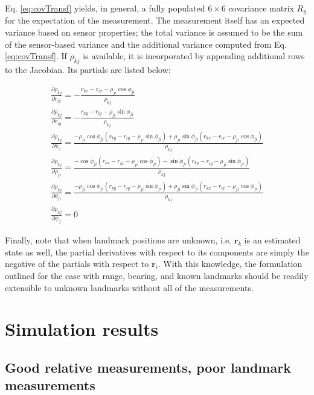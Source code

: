 \documentclass{aiaa-tc}
\newcommand{\B}[1]{\textbf{#1}} %
\begin{document}
Eq. \ref{eq:covTransf} yields, in general, a fully populated $6\times 6$ covariance matrix $R_y$ for the expectation of the measurement. The measurement itself has an expected variance based on sensor properties; the total variance is assumed to be the sum of the sensor-based variance and the additional variance computed from Eq. \ref{eq:covTransf}. If $\rho_{kj}$ is available, it is incorporated by appending additional rows to the Jacobian. Its partials are listed below:

\begin{align}
\frac{ \partial \rho_{kj} }{ \partial r_{ix} } = 
-\frac{ r_{kx}-r_{ix}-\rho_{ji}\cos{\phi_{ji}} }{\rho_{kj}} \\
\frac{ \partial \rho_{kj} }{ \partial r_{iy} } = 
-\frac{ r_{ky}-r_{iy}-\rho_{ji}\sin{\phi_{ji}} }{\rho_{kj}} \\
\frac{ \partial \rho_{kj} }{ \partial \psi_{i} } = 
\frac{ -\rho_{ji}\cos{\phi_{ji}}(r_{ky}-r_{iy}-\rho_{ji}\sin{\phi_{ji}}) + \rho_{ji}\sin{\phi_{ji}}(r_{kx}-r_{ix}-\rho_{ji}\cos{\phi_{ji}}) }{\rho_{kj}} \\
\frac{ \partial \rho_{kj} }{ \partial \rho_{ji} } = 
\frac{ -\cos{\phi_{ji}}(r_{kx}-r_{ix}-\rho_{ji}\cos{\phi_{ji}}) - \sin{\phi_{ji}}(r_{ky}-r_{iy}-\rho_{ji}\sin{\phi_{ji}}) }{\rho_{kj}} \\
\frac{ \partial \rho_{kj} }{ \partial \theta_{ji} } = \frac{ -\rho_{ji}\cos{\phi_{ji}}(r_{ky}-r_{iy}-\rho_{ji}\sin{\phi_{ji}}) + \rho_{ji}\sin{\phi_{ji}}(r_{kx}-r_{ix}-\rho_{ji}\cos{\phi_{ji}}) }{\rho_{kj}} \\
\frac{\partial \rho_{kj}}{\partial \psi_j} = 0
\end{align}

Finally, note that when landmark positions are unknown, i.e. $\B{r}_k$ is an estimated state as well, the partial derivatives with respect to its components are simply the negative of the partials with respect to $\B{r}_i$. With this knowledge, the formulation outlined for the case with range, bearing, and known landmarks should be readily extensible to unknown landmarks without all of the measurements.

\section{Simulation results}

\subsection{Good relative measurements, poor landmark measurements}
\end{document}
